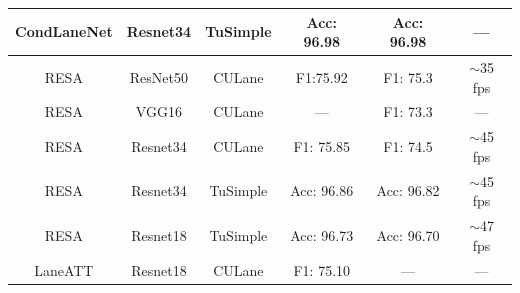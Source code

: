 \begin{table}[]
\begin{tabular}{|c|c|c|c|c|c|}
CondLaneNet       & Resnet34                                                            & TuSimple         & Acc: 96.98                                                            & Acc: 96.98                                                          & —                                                                                   \\ \hline
RESA              & ResNet50                                                            & CULane           & F1:75.92                                                              & F1: 75.3                                                            & $\sim$35 fps                                                                        \\ \hline
RESA              & VGG16                                                               & CULane           & —                                                                     & F1: 73.3                                                            & —                                                                                   \\ \hline
RESA              & Resnet34                                                            & CULane           & F1: 75.85                                                             & F1: 74.5                                                            & $\sim$45 fps                                                                        \\ \hline
RESA              & Resnet34                                                            & TuSimple         & Acc: 96.86                                                            & Acc: 96.82                                                          & $\sim$45 fps                                                                        \\ \hline
RESA              & Resnet18                                                            & TuSimple         & Acc: 96.73                                                            & Acc: 96.70                                                          & $\sim$47 fps                                                                        \\ \hline
LaneATT           & Resnet18                                                            & CULane           & F1: 75.10                                                             & —                                                                   & —                                                                                   \\ \hline

\end{tabular}
\end{table}

